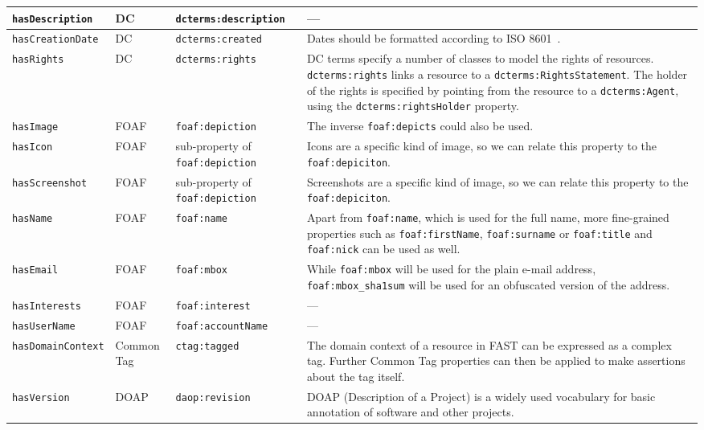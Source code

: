 \documentclass[twoside]{fast_latex}
\newcommand{\todo}[1]{\textsf{\textbf{\textcolor{Orange}{[[TODO: #1]]}}}}
\newcommand{\todo}[1]{}
\begin{document}
\begin{small}
\begin{longtable}{|p{3cm}|p{1.5cm}|p{3.5cm}|p{6.1cm}|}
\texttt{hasDescription} & DC & \texttt{dcterms:description} & --- \\ \hline
\texttt{hasCreationDate} & DC & \texttt{dcterms:created} & Dates should be formatted according to ISO 8601~\cite{w3c_iso8601_1997}. \\ \hline
\texttt{hasRights} & DC & \texttt{dcterms:rights} & DC terms specify a number of classes to model the rights of resources. \texttt{dcterms:rights} links a resource to a \texttt{dcterms:RightsStatement}. The holder of the rights is specified by pointing from the resource to a \texttt{dcterms:Agent}, using the \texttt{dcterms:rightsHolder} property. \\ \hline
\texttt{hasImage} & FOAF & \texttt{foaf:depiction} & The inverse \texttt{foaf:depicts} could also be used. \\ \hline
\texttt{hasIcon} & FOAF & sub-property of \texttt{foaf:depiction} & Icons are a specific kind of image, so we can relate this property to the \texttt{foaf:depiciton}. \\ \hline
\texttt{hasScreenshot} & FOAF & sub-property of \texttt{foaf:depiction} & Screenshots are a specific kind of image, so we can relate this property to the \texttt{foaf:depiciton}. \\ \hline
\texttt{hasName} & FOAF & \texttt{foaf:name} & Apart from \texttt{foaf:name}, which is used for the full name, more fine-grained properties such as \texttt{foaf:firstName}, \texttt{foaf:surname} or \texttt{foaf:title} and \texttt{foaf:nick} can be used as well. \\ \hline
\texttt{hasEmail} & FOAF & \texttt{foaf:mbox} & While \texttt{foaf:mbox} will be used for the plain e-mail address, \texttt{foaf:mbox\_sha1sum} will be used for an obfuscated version of the address. \\ \hline
\texttt{hasInterests} & FOAF & \texttt{foaf:interest} & --- \\ \hline
\texttt{hasUserName} & FOAF & \texttt{foaf:accountName} & --- \\ \hline
\texttt{hasDomainContext} & Common Tag & \texttt{ctag:tagged} & The domain context of a resource in FAST can be expressed as a complex tag. Further Common Tag properties can then be applied to make assertions about the tag itself. \\ \hline
\texttt{hasVersion} & DOAP & \texttt{daop:revision} & DOAP (Description of a Project) is a widely used vocabulary for basic annotation of software and other projects. \\ \hline
\end{longtable}
\end{small}
\doublespacing
\end{document}
